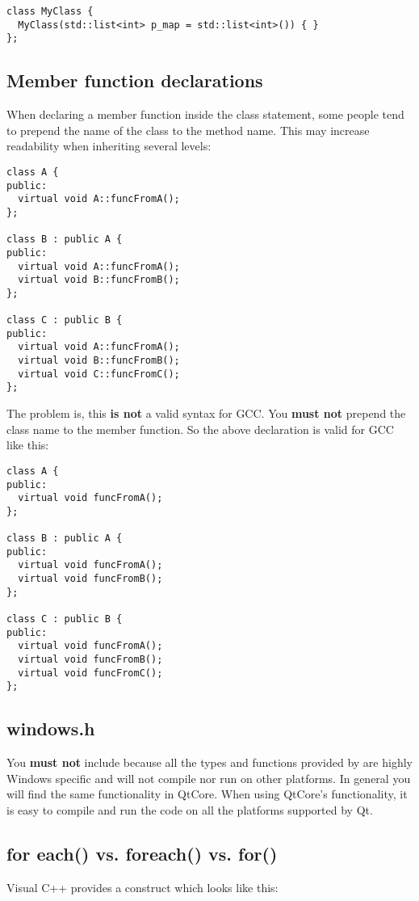 \begin{verbatim}
class MyClass {
  MyClass(std::list<int> p_map = std::list<int>()) { }
};
\end{verbatim}

\subsection{Member function declarations} When declaring a member function inside the class statement, some people tend to prepend the name of the class to the method name. This may increase readability when inheriting several levels:
\begin{verbatim}
class A {
public:
  virtual void A::funcFromA();
};

class B : public A {
public:
  virtual void A::funcFromA();
  virtual void B::funcFromB();
};

class C : public B {
public:
  virtual void A::funcFromA();
  virtual void B::funcFromB();
  virtual void C::funcFromC();
};
\end{verbatim}

The problem is, this \textbf{is not} a valid syntax for GCC. You \textbf{must not} prepend the class name to the member function. So the above declaration is valid for GCC like this:

\begin{verbatim}
class A {
public:
  virtual void funcFromA();
};

class B : public A {
public:
  virtual void funcFromA();
  virtual void funcFromB();
};

class C : public B {
public:
  virtual void funcFromA();
  virtual void funcFromB();
  virtual void funcFromC();
};
\end{verbatim}

\subsection{windows.h}

You \textbf{must not} include  because all the types and functions provided by  are highly Windows specific and will not compile nor run on other platforms. In general you will find the same functionality in QtCore. When using QtCore's functionality, it is easy to compile and run the code on all the platforms supported by Qt.

\subsection{for each() vs. foreach() vs. for()} Visual C++ provides a construct which looks like this:

